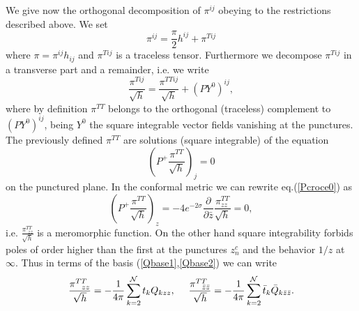 \documentclass[a4paper,12pt]{article}
\begin{document}
We give now the orthogonal decomposition of $\pi^{ij}$ obeying to the
restrictions described above. We set
\begin{equation}
\pi^{ij} = \frac{\pi}{2} h^{ij} + \pi^{T ij}
\end{equation}
where $\pi = \pi^{ij}h_{ij}$ and $\pi^{T ij}$ is a
traceless tensor. Furthermore we decompose $\pi^{T ij}$ in a
transverse part and a remainder, i.e. we write
\begin{equation}
\frac{\pi^{Tij}}{\sqrt h} =\frac{\pi^{TTij} }{\sqrt h} + (PY^0)^{ij},
\end{equation}
where by definition $\pi^{TT}$ belongs to the orthogonal (traceless)
complement to $(PY^0)^{ij}$, being $Y^0$ the square integrable vector
fields vanishing at the punctures. The previously defined $\pi^{TT}$
are solutions (square integrable) of the equation
\begin{equation}\label{Pcroce0}
\left(P^+\frac{\pi^{TT}}{\sqrt h} \right)_j =0
\end{equation}
on the punctured plane. In the conformal metric we can rewrite 
eq.(\ref{Pcroce0}) as
\begin{equation}
\left(P^+\frac{\pi^{TT}}{\sqrt h} \right)_z =
-4 e^{-2\sigma}\frac{\partial}{\partial \bar z} \frac{\pi^{TT}_{zz}
}{\sqrt h} =0,
\end{equation}
i.e. $\displaystyle{\frac{\pi^{TT}_{~~zz}}{\sqrt h}}$ is a
meromorphic function. On the other hand square integrability forbids
poles of order higher than the first at the punctures $z^c_n$ and the
behavior $1/z$ at $\infty$. Thus in terms of the basis
(\ref{Qbase1},\ref{Qbase2}) 
we can write 
\begin{equation}
\frac{\pi^{TT}_{~~zz}}{\sqrt h} = -\frac{1}{4\pi}\sum_{k=2}^{\cal N} t_k
Q_{kzz},~~~~\frac{\pi^{TT}_{~~\bar z\bar z}}{\sqrt h} =
-\frac{1}{4\pi}\sum_{k=2}^{\cal N} \bar t_k \bar Q_{k\bar z\bar z}. 
\end{equation}
\end{document}
